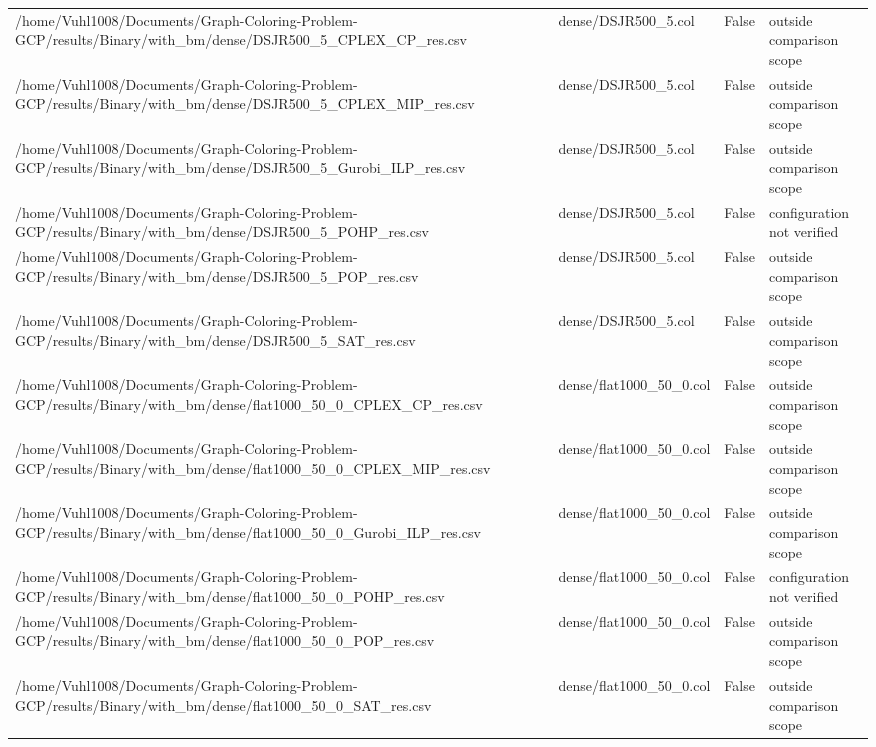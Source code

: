 \begin{table}[htbp]
\begin{tabular}{llll}
/home/Vuhl1008/Documents/Graph-Coloring-Problem-GCP/results/Binary/with\_bm/dense/DSJR500\_5\_CPLEX\_CP\_res.csv & dense/DSJR500\_5.col & False & outside comparison scope \\
/home/Vuhl1008/Documents/Graph-Coloring-Problem-GCP/results/Binary/with\_bm/dense/DSJR500\_5\_CPLEX\_MIP\_res.csv & dense/DSJR500\_5.col & False & outside comparison scope \\
/home/Vuhl1008/Documents/Graph-Coloring-Problem-GCP/results/Binary/with\_bm/dense/DSJR500\_5\_Gurobi\_ILP\_res.csv & dense/DSJR500\_5.col & False & outside comparison scope \\
/home/Vuhl1008/Documents/Graph-Coloring-Problem-GCP/results/Binary/with\_bm/dense/DSJR500\_5\_POHP\_res.csv & dense/DSJR500\_5.col & False & configuration not verified \\
/home/Vuhl1008/Documents/Graph-Coloring-Problem-GCP/results/Binary/with\_bm/dense/DSJR500\_5\_POP\_res.csv & dense/DSJR500\_5.col & False & outside comparison scope \\
/home/Vuhl1008/Documents/Graph-Coloring-Problem-GCP/results/Binary/with\_bm/dense/DSJR500\_5\_SAT\_res.csv & dense/DSJR500\_5.col & False & outside comparison scope \\
/home/Vuhl1008/Documents/Graph-Coloring-Problem-GCP/results/Binary/with\_bm/dense/flat1000\_50\_0\_CPLEX\_CP\_res.csv & dense/flat1000\_50\_0.col & False & outside comparison scope \\
/home/Vuhl1008/Documents/Graph-Coloring-Problem-GCP/results/Binary/with\_bm/dense/flat1000\_50\_0\_CPLEX\_MIP\_res.csv & dense/flat1000\_50\_0.col & False & outside comparison scope \\
/home/Vuhl1008/Documents/Graph-Coloring-Problem-GCP/results/Binary/with\_bm/dense/flat1000\_50\_0\_Gurobi\_ILP\_res.csv & dense/flat1000\_50\_0.col & False & outside comparison scope \\
/home/Vuhl1008/Documents/Graph-Coloring-Problem-GCP/results/Binary/with\_bm/dense/flat1000\_50\_0\_POHP\_res.csv & dense/flat1000\_50\_0.col & False & configuration not verified \\
/home/Vuhl1008/Documents/Graph-Coloring-Problem-GCP/results/Binary/with\_bm/dense/flat1000\_50\_0\_POP\_res.csv & dense/flat1000\_50\_0.col & False & outside comparison scope \\
/home/Vuhl1008/Documents/Graph-Coloring-Problem-GCP/results/Binary/with\_bm/dense/flat1000\_50\_0\_SAT\_res.csv & dense/flat1000\_50\_0.col & False & outside comparison scope \\

\end{tabular}
\end{table}
